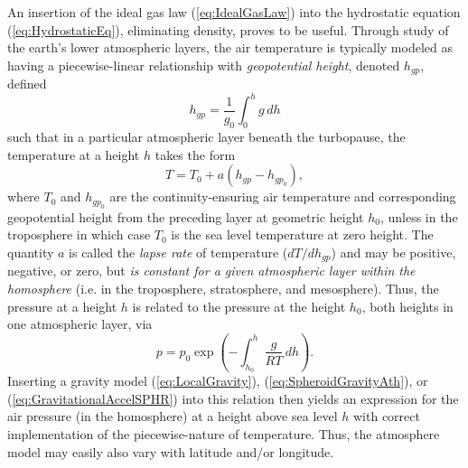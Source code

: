 \documentclass[11pt,dvipsnames]{thesis}
\begin{document}
An insertion of the ideal gas law (\ref{eq:IdealGasLaw}) into the hydrostatic equation (\ref{eq:HydrostaticEq}), eliminating density, proves to be useful. Through study of the earth's lower atmospheric layers, the air temperature is typically modeled as having a piecewise-linear relationship with \textit{geopotential height}, denoted $h_{gp}$, defined
\begin{equation}
h_{gp} = \frac{1}{g_0} \int_0^h g \,dh \label{eq:GeopotentialHeightEq}
\end{equation}
such that in a particular atmospheric layer beneath the turbopause, the temperature at a height $h$ takes the form
\begin{equation}
T = T_0 + a(h_{gp} - h_{gp_0}), \label{eq:TemperatureLinearForm}
\end{equation}
where $T_0$ and $h_{gp_0}$ are the continuity-ensuring air temperature and corresponding geopotential height from the preceding layer at geometric height $h_0$, unless in the troposphere in which case $T_0$ is the sea level temperature at zero height.
The quantity $a$ is called the \textit{lapse rate} of temperature ($dT/dh_{gp}$) and may be positive, negative, or zero, but \textit{is constant for a given atmospheric layer within the homosphere} (i.e. in the troposphere, stratosphere, and mesosphere). 
Thus, the pressure at a height $h$ is related to the pressure at the height $h_0$, both heights in one atmospheric layer, via
\begin{equation}
p = p_0 \exp\left(-\int_{h_0}^{h} \frac{g}{R T} \,dh\right). \label{eq:PressureRelation}
\end{equation}
Inserting a gravity model (\ref{eq:LocalGravity}), (\ref{eq:SpheroidGravityAth}), or (\ref{eq:GravitationalAccelSPHR}) into this relation then yields an expression for the air pressure (in the homosphere) at a height above sea level $h$ with correct implementation of the piecewise-nature of temperature. Thus, the atmosphere model may easily also vary with latitude and/or longitude. 
\end{document}
